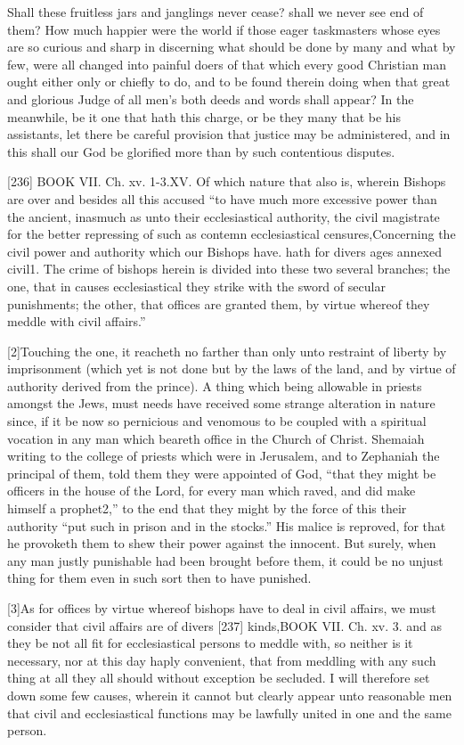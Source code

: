 Shall these fruitless jars and janglings never cease? shall we never see end of them? How much happier were the world if those eager taskmasters whose eyes are so curious and sharp in discerning what should be done by many and what by few, were all changed into painful doers of that which every good Christian man ought either only or chiefly to do, and to be found therein doing when that great and glorious Judge of all men’s both deeds and words shall appear? In the meanwhile, be it one that hath this charge, or be they many that be his assistants, let there be careful provision that justice may be administered, and in this shall our God be glorified more than by such contentious disputes.

[236]
BOOK VII. Ch. xv. 1-3.XV. Of which nature that also is, wherein Bishops are over and besides all this accused “to have much more excessive power than the ancient, inasmuch as unto their ecclesiastical authority, the civil magistrate for the better repressing of such as contemn ecclesiastical censures,Concerning the civil power and authority which our Bishops have. hath for divers ages annexed civil1. The crime of bishops herein is divided into these two several branches; the one, that in causes ecclesiastical they strike with the sword of secular punishments; the other, that offices are granted them, by virtue whereof they meddle with civil affairs.”

[2]Touching the one, it reacheth no farther than only unto restraint of liberty by imprisonment (which yet is not done but by the laws of the land, and by virtue of authority derived from the prince). A thing which being allowable in priests amongst the Jews, must needs have received some strange alteration in nature since, if it be now so pernicious and venomous to be coupled with a spiritual vocation in any man which beareth office in the Church of Christ. Shemaiah writing to the college of priests which were in Jerusalem, and to Zephaniah the principal of them, told them they were appointed of God, “that they might be officers in the house of the Lord, for every man which raved, and did make himself a prophet2,” to the end that they might by the force of this their authority “put such in prison and in the stocks.” His malice is reproved, for that he provoketh them to shew their power against the innocent. But surely, when any man justly punishable had been brought before them, it could be no unjust thing for them even in such sort then to have punished.

[3]As for offices by virtue whereof bishops have to deal in civil affairs, we must consider that civil affairs are of divers [237] kinds,BOOK VII. Ch. xv. 3. and as they be not all fit for ecclesiastical persons to meddle with, so neither is it necessary, nor at this day haply convenient, that from meddling with any such thing at all they all should without exception be secluded. I will therefore set down some few causes, wherein it cannot but clearly appear unto reasonable men that civil and ecclesiastical functions may be lawfully united in one and the same person.

